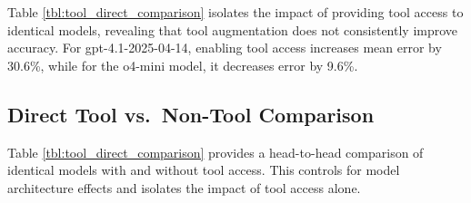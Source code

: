 Table \ref{tbl:tool_direct_comparison} isolates the impact of providing
tool access to identical models, revealing that tool augmentation does
not consistently improve accuracy. For gpt-4.1-2025-04-14, enabling tool
access increases mean error by 30.6\%, while for the o4-mini model, it
decreases error by 9.6\%.

\subsection{Direct Tool vs.~Non-Tool
Comparison}\label{d.1-direct-tool-vs.-non-tool-comparison}

Table \ref{tbl:tool_direct_comparison} provides a head-to-head
comparison of identical models with and without tool access. This
controls for model architecture effects and isolates the impact of tool
access alone.

